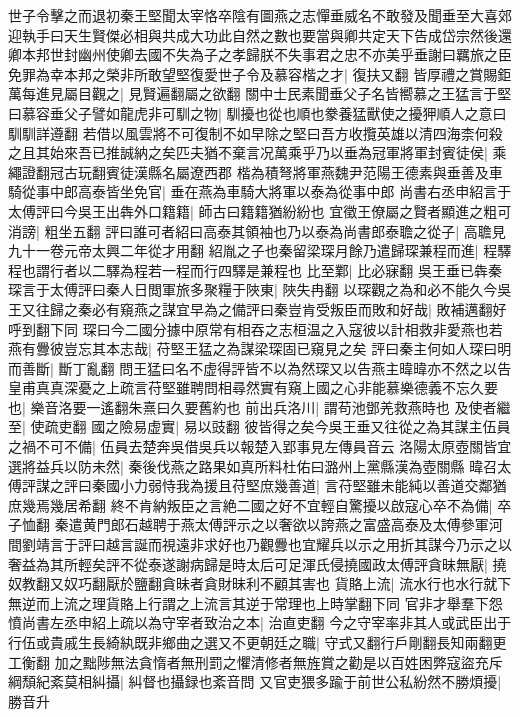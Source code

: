 世子令擊之而退初秦王堅聞太宰恪卒陰有圖燕之志憚垂威名不敢發及聞垂至大喜郊迎執手曰天生賢傑必相與共成大功此自然之數也要當與卿共定天下告成岱宗然後還卿本邦世封幽州使卿去國不失為子之孝歸朕不失事君之忠不亦美乎垂謝曰羈旅之臣免罪為幸本邦之榮非所敢望堅復愛世子令及慕容楷之才|{
	復扶又翻}
皆厚禮之賞賜鉅萬每進見屬目觀之|{
	見賢遍翻屬之欲翻}
關中士民素聞垂父子名皆嚮慕之王猛言于堅曰慕容垂父子譬如龍虎非可馴之物|{
	馴擾也從也順也豢養猛獸使之擾狎順人之意曰馴馴詳遵翻}
若借以風雲將不可復制不如早除之堅曰吾方收攬英雄以清四海柰何殺之且其始來吾已推誠納之矣匹夫猶不棄言况萬乘乎乃以垂為冠軍將軍封賓徒侯|{
	乘繩證翻冠古玩翻賓徒漢縣名屬遼西郡}
楷為積弩將軍燕魏尹范陽王德素與垂善及車騎從事中郎高泰皆坐免官|{
	垂在燕為車騎大將軍以泰為從事中郎}
尚書右丞申紹言于太傅評曰今吳王出犇外口籍籍|{
	師古曰籍籍猶紛紛也}
宜徵王僚屬之賢者顯進之粗可消謗|{
	粗坐五翻}
評曰誰可者紹曰高泰其領袖也乃以泰為尚書郎泰聸之從子|{
	高聸見九十一卷元帝太興二年從才用翻}
紹胤之子也秦留梁琛月餘乃遣歸琛兼程而進|{
	程驛程也謂行者以二驛為程若一程而行四驛是兼程也}
比至鄴|{
	比必寐翻}
吳王垂已犇秦琛言于太傅評曰秦人日閲軍旅多聚糧于陜東|{
	陜失冉翻}
以琛觀之為和必不能久今吳王又往歸之秦必有窺燕之謀宜早為之備評曰秦豈肯受叛臣而敗和好哉|{
	敗補邁翻好呼到翻下同}
琛曰今二國分據中原常有相吞之志桓温之入寇彼以計相救非愛燕也若燕有釁彼豈忘其本志哉|{
	苻堅王猛之為謀梁琛固已窺見之矣}
評曰秦主何如人琛曰明而善斷|{
	斷丁亂翻}
問王猛曰名不虚得評皆不以為然琛又以告燕主暐暐亦不然之以告皇甫真真深憂之上疏言苻堅雖聘問相尋然實有窺上國之心非能慕樂德義不忘久要也|{
	樂音洛要一遙翻朱熹曰久要舊約也}
前出兵洛川|{
	謂苟池鄧羌救燕時也}
及使者繼至|{
	使疏吏翻}
國之險易虚實|{
	易以豉翻}
彼皆得之矣今吳王垂又往從之為其謀主伍員之禍不可不備|{
	伍員去楚奔吳借吳兵以報楚入郢事見左傳員音云}
洛陽太原壺關皆宜選將益兵以防未然|{
	秦後伐燕之路果如真所料杜佑曰潞州上黨縣漢為壺關縣}
暐召太傅評謀之評曰秦國小力弱恃我為援且苻堅庶幾善道|{
	言苻堅雖未能純以善道交鄰猶庶幾焉幾居希翻}
終不肯納叛臣之言絶二國之好不宜輕自驚擾以啟寇心卒不為備|{
	卒子恤翻}
秦遣黄門郎石越聘于燕太傅評示之以奢欲以誇燕之富盛高泰及太傅參軍河間劉靖言于評曰越言誕而視遠非求好也乃觀釁也宜耀兵以示之用折其謀今乃示之以奢益為其所輕矣評不從泰遂謝病歸是時太后可足渾氏侵撓國政太傅評貪昧無厭|{
	撓奴教翻又奴巧翻厭於鹽翻貪昧者貪財昧利不顧其害也}
貨賂上流|{
	流水行也水行就下無逆而上流之理貨賂上行謂之上流言其逆于常理也上時掌翻下同}
官非才舉羣下怨憤尚書左丞申紹上疏以為守宰者致治之本|{
	治直吏翻}
今之守宰率非其人或武臣出于行伍或貴戚生長綺紈既非鄉曲之選又不更朝廷之職|{
	守式又翻行戶剛翻長知兩翻更工衡翻}
加之黜陟無法貪惰者無刑罰之懼清修者無旌賞之勸是以百姓困弊寇盜充斥綱頹紀紊莫相糾攝|{
	糾督也攝録也紊音問}
又官吏猥多踰于前世公私紛然不勝煩擾|{
	勝音升}
